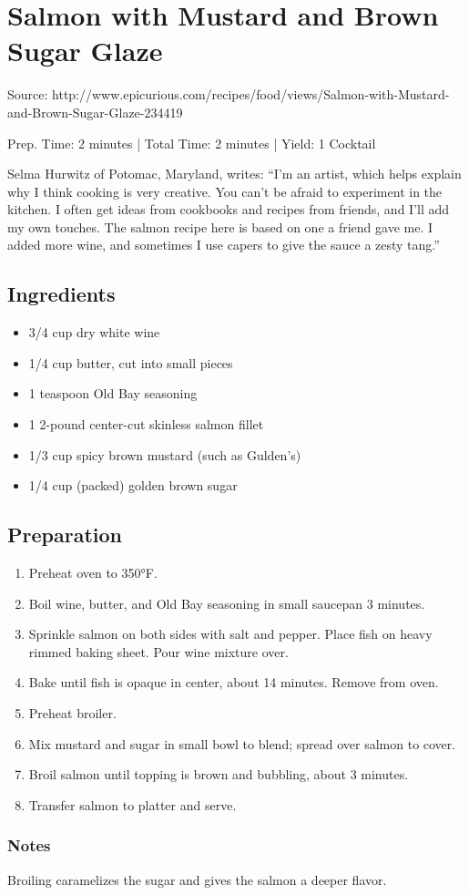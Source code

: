 \section{Salmon with Mustard and Brown Sugar Glaze}

Source: http://www.epicurious.com/recipes/food/views/Salmon-with-Mustard-and-Brown-Sugar-Glaze-234419

\begin{center}
Prep. Time: 2 minutes |
Total Time: 2 minutes | 
Yield: 1 Cocktail

\vspace{1em}

Selma Hurwitz of Potomac, Maryland, writes: ``I'm an artist, which helps explain why I think cooking is very creative. You can't be afraid to experiment in the kitchen. I often get ideas from cookbooks and recipes from friends, and I'll add my own touches. The salmon recipe here is based on one a friend gave me. I added more wine, and sometimes I use capers to give the sauce a zesty tang.''
\end{center}

\subsection{Ingredients}
\begin{itemize}
    \item 3/4 cup dry white wine
    \item 1/4 cup butter, cut into small pieces
    \item 1 teaspoon Old Bay seasoning
    \item 1 2-pound center-cut skinless salmon fillet
    \item 1/3 cup spicy brown mustard (such as Gulden's)
    \item 1/4 cup (packed) golden brown sugar
\end{itemize}

\subsection{Preparation}
\begin{enumerate}
    \item Preheat oven to 350°F.
    \item Boil wine, butter, and Old Bay seasoning in small saucepan 3 minutes.
    \item Sprinkle salmon on both sides with salt and pepper. Place fish on heavy rimmed baking sheet. Pour wine mixture over.
    \item Bake until fish is opaque in center, about 14 minutes. Remove from oven.
    \item Preheat broiler.
    \item Mix mustard and sugar in small bowl to blend; spread over salmon to cover.
    \item Broil salmon until topping is brown and bubbling, about 3 minutes.
    \item Transfer salmon to platter and serve.
\end{enumerate}


\subsubsection{Notes}
Broiling caramelizes the sugar and gives the salmon a deeper flavor.



